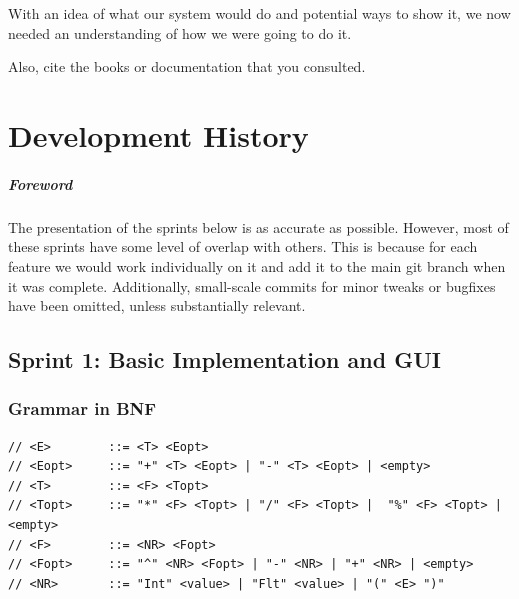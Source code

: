 \documentclass[a4paper, oneside, 11pt]{report}
\begin{document}
    With an idea of what our system would do and potential ways to show it, we now needed an understanding of how we were going to do it.


    Also, cite the books \citep{Nystrom:2021} or documentation \citep{WPF:2023} that you consulted.
    \chapter{Development History}\label{Chap:DevHist}






    \paragraph{Foreword} The presentation of the sprints below is as accurate as possible. However, most of these sprints have some level of overlap with others. This is because for each feature we would work individually on it and add it to the main git branch when it was complete. Additionally, small-scale commits for minor tweaks or bugfixes have been omitted, unless substantially relevant.


    \section{Sprint 1: Basic Implementation and GUI}
    \subsection{Grammar in BNF}
    \begin{verbatim}
// <E>        ::= <T> <Eopt>
// <Eopt>     ::= "+" <T> <Eopt> | "-" <T> <Eopt> | <empty>
// <T>        ::= <F> <Topt>
// <Topt>     ::= "*" <F> <Topt> | "/" <F> <Topt> |  "%" <F> <Topt> |<empty>
// <F>        ::= <NR> <Fopt>
// <Fopt>     ::= "^" <NR> <Fopt> | "-" <NR> | "+" <NR> | <empty>
// <NR>       ::= "Int" <value> | "Flt" <value> | "(" <E> ")"
    \end{verbatim}
\end{document}
